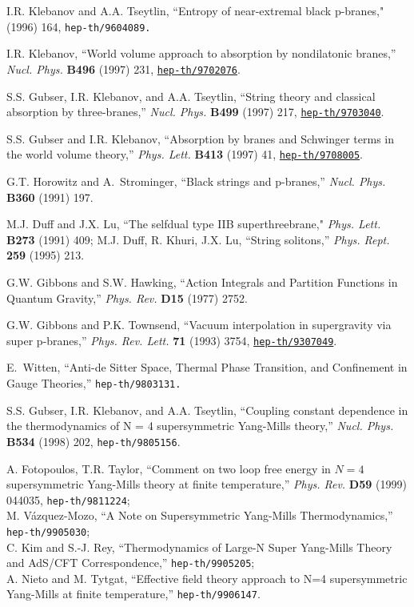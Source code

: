 \documentclass[12pt]{article}
\begin{document}
\begin{thebibliography}{99}
I.R. Klebanov and A.A. Tseytlin, 
``Entropy of near-extremal black p-branes,"
 (1996) 164, {\tt hep-th/9604089.}

I.R. Klebanov, ``World volume approach to absorption by nondilatonic branes,''
  {\em Nucl. Phys.} {\bf B496} (1997) 231,
  \href{http://xxx.lanl.gov/abs/hep-th/9702076}{{\tt hep-th/9702076}}.

S.S. Gubser, I.R. Klebanov, and A.A. Tseytlin, ``String theory and classical
 \\  absorption by three-branes,'' {\em Nucl. Phys.} {\bf B499} (1997) 217,
  \href{http://xxx.lanl.gov/abs/hep-th/9703040}{{\tt hep-th/9703040}}.

S.S. Gubser and I.R. Klebanov, ``Absorption by branes and Schwinger terms in
  the world volume theory,'' {\em Phys. Lett.} {\bf B413} (1997) 41,
  \href{http://xxx.lanl.gov/abs/hep-th/9708005}{{\tt hep-th/9708005}}.

G.T. Horowitz and A.~Strominger, ``Black strings and p-branes,'' {\em Nucl.
  Phys.} {\bf B360} (1991) 197.


M.J. Duff  and J.X. Lu, 
``The selfdual  type IIB  superthreebrane,"
{\em Phys. Lett.}  {\bf B273} (1991)  409;
M.J. Duff, R. Khuri, J.X. Lu, ``String solitons,''
    {\em Phys. Rept.} {\bf 259} (1995) 213.

G.W. Gibbons and S.W. Hawking, ``Action Integrals and Partition Functions
in Quantum Gravity,'' {\em Phys. Rev.} {\bf D15} (1977) 2752.

G.W. Gibbons and P.K. Townsend, ``Vacuum interpolation in supergravity via
  super p-branes,'' {\em Phys. Rev. Lett.} {\bf 71} (1993) 3754,
  \href{http://xxx.lanl.gov/abs/hep-th/9307049}{{\tt hep-th/9307049}}.

E.~Witten, ``Anti-de Sitter Space, Thermal
Phase Transition, and Confinement in Gauge Theories,''
{\tt hep-th/9803131.}

S.S. Gubser, I.R. Klebanov, and A.A. Tseytlin,
``Coupling constant dependence in the thermodynamics
of {\cal N} = 4 supersymmetric Yang-Mills theory,''
{\em Nucl. Phys.} {\bf B534} (1998) 202, {{\tt hep-th/9805156}}.

A. Fotopoulos, T.R. Taylor, 
``Comment on two loop free energy in $N=4$ supersymmetric Yang-Mills
theory at finite temperature,'' {\em Phys. Rev.} {\bf D59} (1999)
044035, {\tt hep-th/9811224};\\
M. V\' azquez-Mozo, ``A Note on Supersymmetric Yang-Mills
Thermodynamics,'' {\tt hep-th/9905030};\\
C. Kim and S.-J. Rey, ``Thermodynamics of Large-N Super Yang-Mills
Theory and AdS/CFT Correspondence,''
{\tt hep-th/9905205};\\
A. Nieto and M. Tytgat, ``Effective field theory approach to N=4
supersymmetric Yang-Mills at finite temperature,''
{\tt hep-th/9906147}.



\end{thebibliography}
\end{document}
